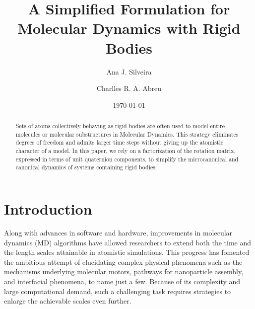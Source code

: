 \documentclass[aip,jcp,reprint,amsmath,amssymb]{revtex4-1}
\begin{document}
\title{A Simplified Formulation for Molecular Dynamics with Rigid Bodies}

\author{Ana J. Silveira}

\author{Charlles R. A. Abreu}

\date{\today}

\begin{abstract}
Sets of atoms collectively behaving as rigid bodies are often used to model entire molecules or molecular substructures in Molecular Dynamics. This strategy eliminates degrees of freedom and admits larger time steps without giving up the atomistic character of a model. In this paper, we rely on a factorization of the rotation matrix, expressed in terms of unit quaternion components, to simplify the microcanonical and canonical dynamics of systems containing rigid bodies.
\end{abstract}

\maketitle

\section{Introduction}

Along with advances in software and hardware, improvements in molecular dynamics (MD) algorithms have allowed researchers to extend both the time and the length scales attainable in atomistic simulations. This progress has fomented the ambitious attempt of elucidating complex physical phenomena such as the mechanisms underlying molecular motors, pathways for nanoparticle assembly, and interfacial phenomena, to name just a few. Because of its complexity and large computational demand, such a challenging task requires strategies to enlarge the achievable scales even further.
\end{document}
